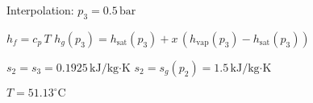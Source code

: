Interpolation:  
\( p_3 = 0.5 \, \text{bar} \)  

\( h_f = c_p \, T \)  
\( h_g(p_3) = h_{\text{sat}}(p_3) + x \, (h_{\text{vap}}(p_3) - h_{\text{sat}}(p_3)) \)  

\( s_2 = s_3 = 0.1925 \, \text{kJ/kg·K} \)  
\( s_2 = s_g(p_2) = 1.5 \, \text{kJ/kg·K} \)  

\( T = 51.13^\circ \text{C} \)